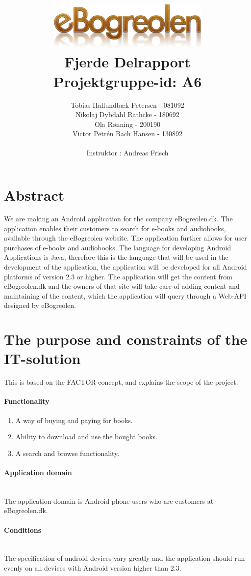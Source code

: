\documentclass[12pt]{article}
\title{\includegraphics[scale=1]{store_logo}\\Fjerde Delrapport \\ Projektgruppe-id: A6}
\author{Tobias Hallundbæk Petersen - 081092\\Nikolaj Dybdahl Rathcke - 180692\\ Ola Rønning - 200190\\ Victor Petrén Bach Hansen - 130892 \\\\ Instruktor : Andreas Frisch}
\begin{document}
\maketitle
\newpage
\tableofcontents
\newpage
\section{Abstract}
We are making an Android application for the company eBogreolen.dk. The application enables their customers to search for e-books and audiobooks, available through the eBogreolen website. The application further allows for user purchases of e-books and audiobooks. The language for developing Android Applications is Java, therefore this is the language that will be used in the development of the application, the application will be developed for all Android platforms of version 2.3 or higher. The application will get the content from eBogreolen.dk and the owners of that site will take care of adding content and maintaining of the content, which the application will query through a Web-API designed by eBogreolen.

\section{The purpose and constraints of the IT-solution}
This is based on the FACTOR-concept, and explains the scope of the project.
\paragraph{Functionality}
\begin{enumerate}
\item A way of buying and paying for books.
\item Ability to download and use the bought books.
\item A search and browse functionality.
\end{enumerate}

\paragraph{Application domain}$ $\\
The application domain is Android phone users who are customers at eBogreolen.dk.

\paragraph{Conditions}$ $\\
The specification of android devices vary greatly and the application should run evenly on all devices with Android version higher than 2.3.
\end{document}
